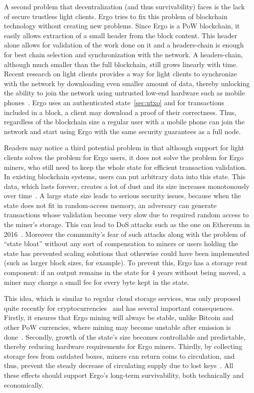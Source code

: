 A second problem that decentralization (and thus survivability) faces is the lack of secure trustless light clients. Ergo tries to fix this problem of blockchain technology without creating new problems. Since Ergo is a PoW blockchain, it easily allows extraction of a small header from the block content.
This header alone allows for validation of the work done on it and a headers-chain is enough for best chain selection and synchronization with the network.
A headers-chain, although much smaller than the full blockchain, still grows linearly with time.
Recent research on light clients provides a way for light clients to synchronize with the network by downloading even smaller amount of data, thereby unlocking the ability to join the network using untrusted low-end hardware such as mobile phones~\cite{kiayias2017non,luuflyclient}.
Ergo uses an authenticated state~\ref{sec:utxo} and for transactions included in a block, a client may download a proof of their correctness.
Thus, regardless of the blockchain size a regular user with
a mobile phone can join the network and start using Ergo with the same security
guarantees as a full node.

Readers may notice a third potential problem in that although support for light clients solves the problem for Ergo users, it does not solve the problem for Ergo miners, who still need to keep the whole state for efficient transaction validation.
In existing blockchain systems, users can put arbitrary data into this state. This data, which lasts forever, creates a lot of dust and its size increases monotonously over time~\cite{perez2019another}.
A large state size leads to serious security issues, because when the state does not fit in random-access memory, an adversary can generate transactions whose validation become very slow due to required random access to the miner's storage. This can lead to DoS attacks such as the one on Ethereum in 2016~\cite{ethDos2016}.
Moreover the community's fear of such attacks along with the problem of ``state bloat'' without any sort of compensation to miners or users holding the state has prevented scaling solutions that otherwise
could have been implemented (such as larger block sizes, for example).
To prevent this, Ergo has a storage rent component: if an
output remains in the state for 4 years without being moved, a miner may charge a small fee for every
byte kept in the state.

This idea, which is similar to regular cloud storage services, was only proposed quite recently for cryptocurrencies~\cite{chepurnoy2017space} and has several important consequences.
Firstly, it ensures that Ergo mining will always be stable, unlike Bitcoin and other PoW currencies, where mining may become unstable after emission is done~\cite{carlsten2016instability}.
Secondly, growth of the state's size becomes controllable and predictable, thereby reducing hardware requirements for Ergo miners.
Thirdly, by collecting storage fees from outdated boxes, miners can return coins to circulation, and thus, prevent the steady decrease of circulating supply due to lost keys~\cite{wsj2018}. 
All these effects should support Ergo's long-term survivability, both technically and economically.

